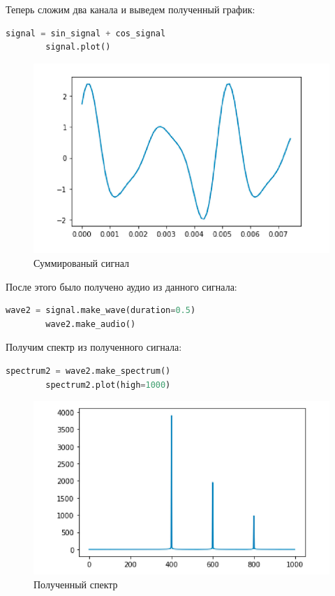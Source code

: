 \documentclass[a4]{article}
\begin{document}
    Теперь сложим два канала и выведем полученный график:

    \begin{lstlisting}[language=Python, caption= Суммирование каналов, label={lst:sum_signal}]
        signal = sin_signal + cos_signal
        signal.plot()
    \end{lstlisting}

    \begin{figure}[H]
        \centering
        \includegraphics[width=\textwidth]{sum_signals}
        \caption{Суммированый сигнал}
        \label{fig:sum_signals}
    \end{figure}

    После этого было получено аудио из данного сигнала:

    \begin{lstlisting}[language=Python, caption= Получение аудио, label={lst:make_audio_from_signals}]
        wave2 = signal.make_wave(duration=0.5)
        wave2.make_audio()
    \end{lstlisting}

    Получим спектр из полученного сигнала:

    \begin{lstlisting}[language=Python, caption= Получение спектра, label={lst:make_spectr_from_signal}]
        spectrum2 = wave2.make_spectrum()
        spectrum2.plot(high=1000)
    \end{lstlisting}

    \begin{figure}[H]
        \centering
        \includegraphics[width=\textwidth]{spectr_signals}
        \caption{Полученный спектр}
        \label{fig:spectr_signals}
    \end{figure}
\end{document}

